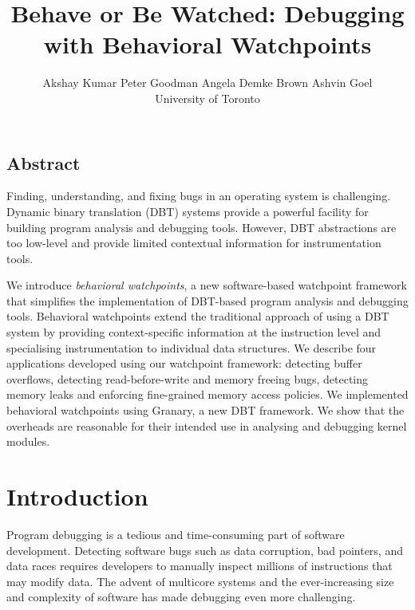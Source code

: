 \documentclass[letterpaper,twocolumn,10pt]{article}
\begin{document}
\date{}

\title{\Large \bf Behave or Be Watched: Debugging with Behavioral Watchpoints}

\author{
{\rm Akshay Kumar} \hspace{1.5em} {\rm Peter Goodman} \hspace{1.5em}  {\rm Angela Demke Brown} \hspace{1.5em} {\rm Ashvin Goel}\\
University of Toronto
} %


\maketitle
\subsection*{Abstract}
Finding, understanding, and fixing bugs in an operating system is challenging. Dynamic binary translation (DBT) systems provide a powerful facility for building program analysis and debugging tools. However, DBT abstractions are too low-level and provide limited contextual information for instrumentation tools.

We introduce \emph{behavioral watchpoints}, a new software-based watchpoint framework that simplifies the implementation of DBT-based program analysis and debugging tools. Behavioral watchpoints extend the traditional approach of using a DBT system by providing context-specific information at the instruction level and specialising instrumentation to individual data structures. We describe four applications developed using our watchpoint framework: detecting buffer overflows, detecting read-before-write and memory freeing bugs, detecting memory leaks and enforcing fine-grained memory access policies. We implemented behavioral watchpoints using Granary, a new DBT framework. We show that the overheads are reasonable for their intended use in analysing and debugging kernel modules.


\section{Introduction}

Program debugging is a tedious and time-consuming part of software development. Detecting software bugs such as data corruption, bad pointers, and data races requires developers to manually inspect millions of instructions that may modify data. The advent of multicore systems and the ever-increasing size and complexity of software has made debugging even more challenging. 
\end{document}
